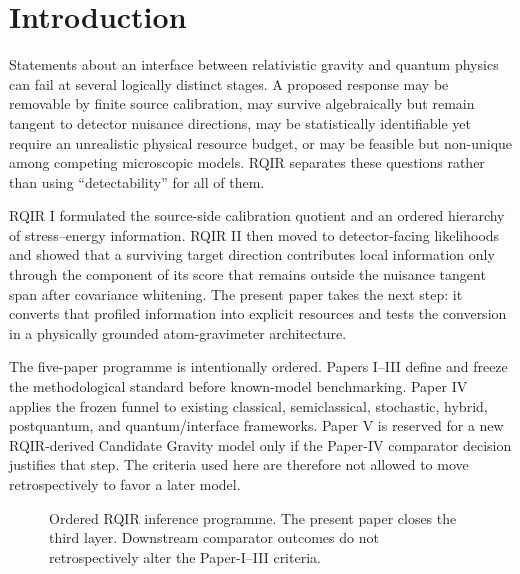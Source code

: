 \section{Introduction}
\label{sec:introduction}

Statements about an interface between relativistic gravity and quantum physics can fail at several logically distinct stages. A proposed response may be removable by finite source calibration, may survive algebraically but remain tangent to detector nuisance directions, may be statistically identifiable yet require an unrealistic physical resource budget, or may be feasible but non-unique among competing microscopic models. RQIR separates these questions rather than using ``detectability'' for all of them.

RQIR I formulated the source-side calibration quotient and an ordered hierarchy of stress--energy information. RQIR II then moved to detector-facing likelihoods and showed that a surviving target direction contributes local information only through the component of its score that remains outside the nuisance tangent span after covariance whitening. The present paper takes the next step: it converts that profiled information into explicit resources and tests the conversion in a physically grounded atom-gravimeter architecture.

The five-paper programme is intentionally ordered. Papers I--III define and freeze the methodological standard before known-model benchmarking. Paper IV applies the frozen funnel to existing classical, semiclassical, stochastic, hybrid, postquantum, and quantum/interface frameworks. Paper V is reserved for a new RQIR-derived Candidate Gravity model only if the Paper-IV comparator decision justifies that step. The criteria used here are therefore not allowed to move retrospectively to favor a later model.

\begin{figure}[t]
\centering
{}
\caption{Ordered RQIR inference programme. The present paper closes the third layer. Downstream comparator outcomes do not retrospectively alter the Paper-I--III criteria.}
\label{fig:ladder}
\end{figure}


